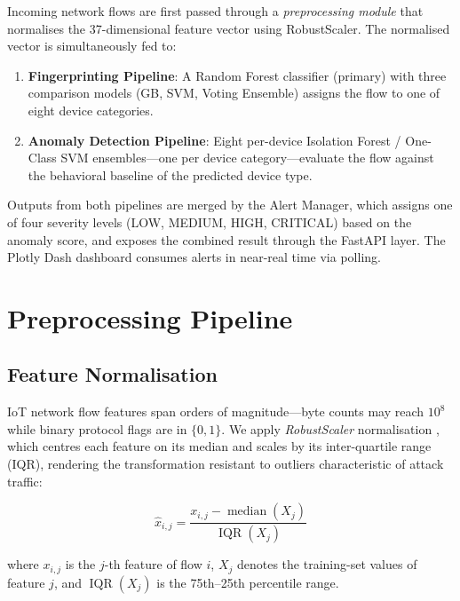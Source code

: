 \documentclass[conference]{IEEEtran}
\begin{document}
Incoming network flows are first passed through a \textit{preprocessing
module} that normalises the 37-dimensional feature vector using
RobustScaler. The normalised vector is simultaneously fed to:

\begin{enumerate}
    \item \textbf{Fingerprinting Pipeline}: A Random Forest classifier
    (primary) with three comparison models (GB, SVM, Voting Ensemble)
    assigns the flow to one of eight device categories.

    \item \textbf{Anomaly Detection Pipeline}: Eight per-device
    Isolation Forest / One-Class SVM ensembles---one per device
    category---evaluate the flow against the behavioral baseline of the
    predicted device type.
\end{enumerate}

Outputs from both pipelines are merged by the Alert Manager, which assigns
one of four severity levels (LOW, MEDIUM, HIGH, CRITICAL) based on the
anomaly score, and exposes the combined result through the FastAPI layer.
The Plotly Dash dashboard consumes alerts in near-real time via polling.

\section{Preprocessing Pipeline}
\label{sec:preprocess}

\subsection{Feature Normalisation}

IoT network flow features span orders of magnitude---byte counts may reach
$10^8$ while binary protocol flags are in $\{0,1\}$. We apply
\textit{RobustScaler} normalisation \cite{pedregosa2011scikit}, which
centres each feature on its median and scales by its inter-quartile range
(IQR), rendering the transformation resistant to outliers characteristic of
attack traffic:

\begin{equation}
    \hat{x}_{i,j} = \frac{x_{i,j} - \operatorname{median}(X_j)}{\operatorname{IQR}(X_j)}
    \label{eq:robust}
\end{equation}

where $x_{i,j}$ is the $j$-th feature of flow $i$, $X_j$ denotes the
training-set values of feature $j$, and $\operatorname{IQR}(X_j)$ is the
75th--25th percentile range.
\end{document}
